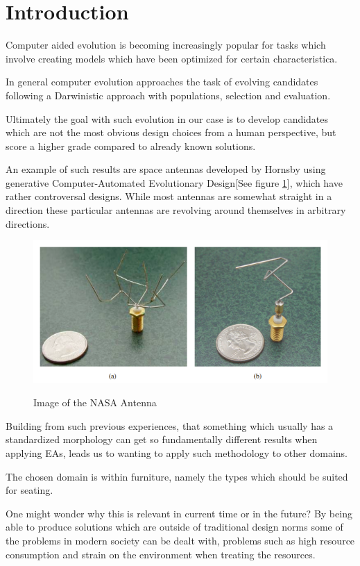 \section{Introduction}
Computer aided evolution is becoming increasingly popular for tasks which involve creating models which have been optimized for certain characteristica.

In general computer evolution approaches the task of evolving candidates following a Darwinistic approach with populations, selection and evaluation\cite{paper:ev3}.

Ultimately the goal with such evolution in our case is to develop candidates which are not the most obvious design choices from a human perspective, but score a higher grade compared to already known solutions.

An example of such results are space antennas developed by Hornsby\cite{paper:ev4} using generative Computer-Automated Evolutionary Design[See figure \ref{fig:nasa_antenna}], which have rather controversal designs. While most antennas are somewhat straight in a direction these particular antennas are revolving around themselves in arbitrary directions.

\begin{figure}[ht]
\includegraphics[scale=.7]{content/img/space_antenna}
\label{fig:nasa_antenna}\\
\caption{Image of the NASA Antenna \cite{paper:ev4} }
\end{figure}

Building from such previous experiences, that something which usually has a standardized morphology can get so fundamentally different results when applying EAs, leads us to wanting to apply such methodology to other domains.

The chosen domain is within furniture, namely the types which should be suited for seating.

One might wonder why this is relevant in current time or in the future?
By being able to produce solutions which are outside of traditional design norms some of the problems in modern society can be dealt with, problems such as high resource consumption and strain on the environment when treating the resources.

